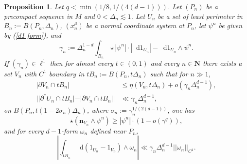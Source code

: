 \documentclass[reqno,10pt]{amsart}
\newcommand{\NN}{\mathbf{N}}
\newcommand*\dif{\mathop{}\!\mathrm{d}}
\newcommand{\normal}{\mathbf n}
\newtheorem{proposition}[theorem]{Proposition}
\theoremstyle{definition}
\numberwithin{equation}{section}
\begin{document}
\begin{proposition}\label{mollifier quant}
Let $q < \min(1/8, 1/(4(d - 1)))$.
Let $(P_n)$ be a precompact sequence in $M$ and $0 < \Delta_n \lesssim 1$.
Let $U_n$ be a set of least perimeter in $B_n := B(P_n, \Delta_n)$, $(x^\mu_n)$ be a normal coordinate system at $P_n$, let $\psi^n$ be given by (\ref{d1 form}), and
$$\gamma_n := \Delta_n^{1 - d} \int_{B_n} \star |\psi^n| \cdot |\dif 1_{U_n}| - \dif 1_{U_n} \wedge \psi^n.$$
If $(\gamma_n) \in \ell^1$ then for almost every $t \in (0, 1)$ and every $n \in \NN$ there exists a set $V_n$ with $C^1$ boundary in $tB_n := B(P_n, t\Delta_n)$ such that for $n \gg 1$,
\begin{align}
|\partial V_n \cap tB_n| &\leq \eta(V_n, t\Delta_n) + o(\gamma_n \Delta_n^{d - 1}), \label{mollifier quant1}\\
||\partial^* U_n \cap tB_n| - |\partial V_n \cap tB_n|| &\ll \gamma_n \Delta_n^{d - 1}, \label{mollifier quant2}
\end{align}
on $B(P_n, t(1 - 2\sigma_n)\Delta_n)$, where $\sigma_n := \gamma_n^{1/(2(d - 1))}$, one has
\begin{equation}
\star(\normal_{V_n} \wedge \psi^n) \geq |\psi^n| \cdot (1 - o(\gamma^q)), \label{mollifier quant4}
\end{equation}
and for every $d-1$-form $\omega_n$ defined near $P_n$,
\begin{equation}\label{mollifier quant3}
\left|\int_{tB_n} \dif(1_{U_n} - 1_{V_n}) \wedge \omega_n\right| \ll \gamma_n \Delta_n^{d - 1} ||\omega_n||_{C^1}.
\end{equation}
\end{proposition}
\end{document}
